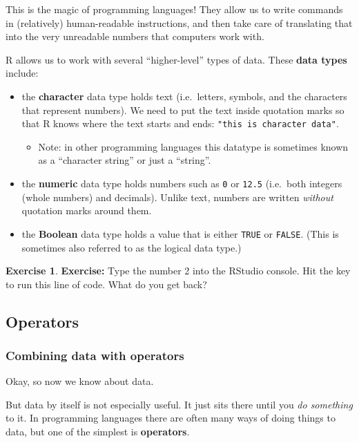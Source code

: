 \documentclass[
]{article}
\providecommand{\tightlist}{%
  \setlength{\itemsep}{0pt}\setlength{\parskip}{0pt}}
\theoremstyle{definition}
\theoremstyle{definition}
\theoremstyle{definition}
\newtheorem{exercise}{Exercise}[section]
\theoremstyle{definition}
\theoremstyle{remark}
\begin{document}
This is the magic of programming languages! They allow us to write commands in (relatively) human-readable instructions, and then take care of translating that into the very unreadable numbers that computers work with.

R allows us to work with several ``higher-level'' types of data. These \textbf{data types} include:

\begin{itemize}
\item
  the \textbf{character} data type holds text (i.e.~letters, symbols, and the characters that represent numbers). We need to put the text inside quotation marks so that R knows where the text starts and ends: \texttt{"this\ is\ character\ data"}.

  \begin{itemize}
  \tightlist
  \item
    Note: in other programming languages this datatype is sometimes known as a ``character string'' or just a ``string''.
  \end{itemize}
\item
  the \textbf{numeric} data type holds numbers such as \texttt{0} or \texttt{12.5} (i.e.~both integers (whole numbers) and decimals). Unlike text, numbers are written \emph{without} quotation marks around them.
\item
  the \textbf{Boolean} data type holds a value that is either \texttt{TRUE} or \texttt{FALSE}. (This is sometimes also referred to as the logical data type.)
\end{itemize}

\begin{exercise}
\textbf{Exercise:} Type the number 2 into the RStudio console. Hit the key to run this line of code. What do you get back?
\end{exercise}

\hypertarget{operators}{%
\subsection{Operators}\label{operators}}

\hypertarget{combining-data-with-operators}{%
\subsubsection{Combining data with operators}\label{combining-data-with-operators}}

Okay, so now we know about data.

But data by itself is not especially useful. It just sits there until you \emph{do something} to it. In programming languages there are often many ways of doing things to data, but one of the simplest is \textbf{operators}.
\end{document}
